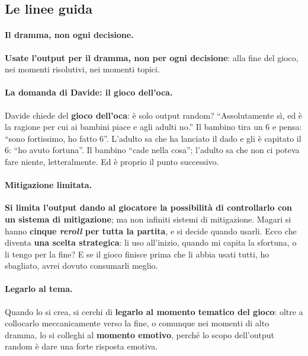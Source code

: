 \subsection{Le linee guida}

\paragraph{Il dramma, non ogni decisione.} \textbf{Usate l'output per il dramma, non per ogni
decisione}: alla fine del gioco, nei momenti risolutivi, nei momenti topici.

\paragraph{La domanda di Davide: il gioco dell'oca.} Davide chiede del \textbf{gioco
dell'oca}: è solo output random? ``Assolutamente sì, ed è la ragione per cui ai bambini piace
e agli adulti no.'' Il bambino tira un 6 e pensa: ``sono fortissimo, ho fatto 6''. L'adulto
sa che ha lanciato il dado e gli è capitato il 6: ``ho avuto fortuna''. Il bambino ``cade
nella cosa''; l'adulto sa che non ci poteva fare niente, letteralmente. Ed è proprio il
punto successivo.

\paragraph{Mitigazione limitata.} \textbf{Si limita l'output dando al giocatore la
possibilità di controllarlo con un sistema di mitigazione}; ma non infiniti sistemi di
mitigazione. Magari si hanno \textbf{cinque \emph{reroll} per tutta la partita}, e si decide
quando usarli. Ecco che diventa \textbf{una scelta strategica}: li uso all'inizio, quando mi
capita la sfortuna, o li tengo per la fine? E se il gioco finisce prima che li abbia usati
tutti, ho sbagliato, avrei dovuto consumarli meglio.

\paragraph{Legarlo al tema.} Quando lo si crea, si cerchi di \textbf{legarlo al momento
tematico del gioco}: oltre a collocarlo meccanicamente verso la fine, o comunque nei momenti di
alto dramma, lo si colleghi al \textbf{momento emotivo}, perché lo scopo dell'output random
è dare una forte risposta emotiva.

